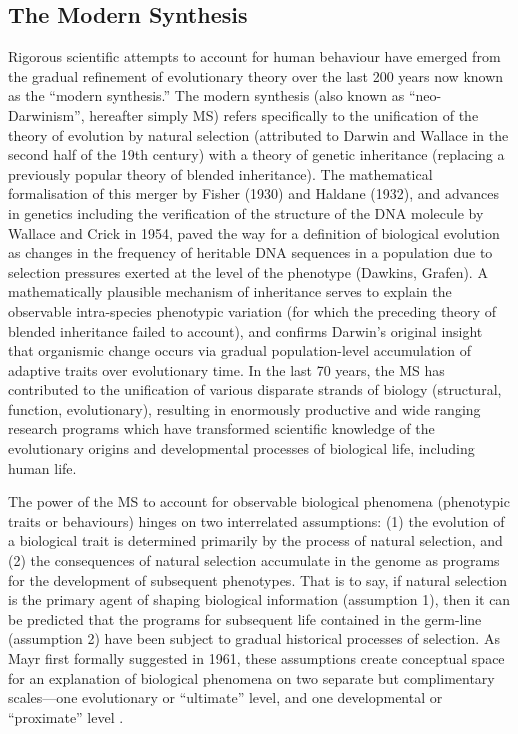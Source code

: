 \subsection{The Modern Synthesis}
Rigorous scientific attempts to account for human behaviour have emerged from the gradual refinement of evolutionary theory over the last 200 years now known as the ``modern synthesis.''  The modern synthesis (also known as ``neo-Darwinism'', hereafter simply MS) refers specifically to the unification of the theory of evolution by natural selection (attributed to Darwin and Wallace in the second half of the 19th century) with a theory of genetic inheritance (replacing a previously popular theory of blended inheritance).  The mathematical formalisation of this merger by Fisher (1930) and Haldane (1932), and advances in genetics including the verification of the structure of the DNA molecule by Wallace and Crick in 1954, paved the way for a definition of biological evolution as changes in the frequency of heritable DNA sequences in a population due to selection pressures exerted at the level of the phenotype (Dawkins, Grafen). A mathematically plausible mechanism of inheritance serves to explain the observable intra-species phenotypic variation (for which the preceding theory of blended inheritance failed to account), and confirms Darwin's original insight that organismic change occurs via gradual population-level accumulation of adaptive traits over evolutionary time.  In the last 70 years, the MS has contributed to the unification of various disparate strands of biology (structural, function, evolutionary), resulting in enormously productive and wide ranging research programs which have transformed scientific knowledge of the evolutionary origins and developmental processes of biological life, including human life.


The power of the MS to account for observable biological phenomena (phenotypic traits or behaviours) hinges on two interrelated assumptions: (1) the evolution of a biological trait is determined primarily by the process of natural selection, and (2) the consequences of natural selection accumulate in the genome as programs for the development of subsequent phenotypes.  That is to say, if natural selection is the primary agent of shaping biological information (assumption 1), then it can be predicted that the programs for subsequent life contained in the germ-line (assumption 2) have been subject to gradual historical processes of selection.  As Mayr first formally suggested in 1961, these assumptions create conceptual space for an explanation of biological phenomena on two separate but complimentary scales---one evolutionary or ``ultimate'' level, and one developmental or ``proximate'' level \citep{Mayr1961}.

